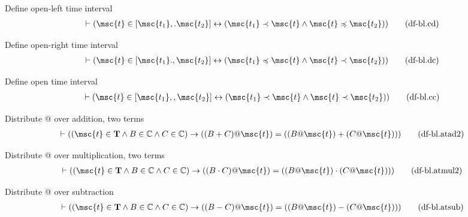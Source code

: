 \begin{metadefinition} Define open-left time interval
\begin{align}
\vdash ( \msc{t} \in [ \msc{t_1} ,. \msc{t_2} ] \leftrightarrow ( \msc{t_1} \prec \msc{t} \wedge \msc{t} \preccurlyeq \msc{t_2} ) )\label{eq:df-bl.cd}\tag{df-bl.cd}
\end{align}
\end{metadefinition}


\begin{metadefinition} Define open-right time interval
\begin{align}
\vdash ( \msc{t} \in [ \msc{t_1} ., \msc{t_2} ] \leftrightarrow ( \msc{t_1} \preccurlyeq \msc{t} \wedge \msc{t} \prec \msc{t_2} ) )\label{eq:df-bl.dc}\tag{df-bl.dc}
\end{align}
\end{metadefinition}


\begin{metadefinition} Define open time interval
\begin{align}
\vdash ( \msc{t} \in [ \msc{t_1} ,, \msc{t_2} ] \leftrightarrow ( \msc{t_1} \prec \msc{t} \wedge \msc{t} \prec \msc{t_2} ) )\label{eq:df-bl.cc}\tag{df-bl.cc}
\end{align}
\end{metadefinition}


\begin{metadefinition} Distribute @ over addition, two terms
\begin{align}
\vdash ( ( \msc{t} \in \mathbf{T} \wedge B \in \mathbb{C} \wedge C \in \mathbb{C} ) \rightarrow ( ( B + C ) @ \msc{t} ) = ( ( B @ \msc{t} ) + ( C @ \msc{t} ) ) )\label{eq:df-bl.atad2}\tag{df-bl.atad2}
\end{align}
\end{metadefinition}


\begin{metadefinition} Distribute @ over multiplication, two terms
\begin{align}
\vdash ( ( \msc{t} \in \mathbf{T} \wedge B \in \mathbb{C} \wedge C \in \mathbb{C} ) \rightarrow ( ( B \cdot C ) @ \msc{t} ) = ( ( B @ \msc{t} ) \cdot ( C @ \msc{t} ) )
    )\label{eq:df-bl.atmul2}\tag{df-bl.atmul2}
\end{align}
\end{metadefinition}


\begin{metadefinition} Distribute @ over subtraction
\begin{align}
\vdash ( ( \msc{t} \in \mathbf{T} \wedge B \in \mathbb{C} \wedge C \in \mathbb{C} ) \rightarrow ( ( B - C ) @ \msc{t} ) = ( ( B @ \msc{t} ) - ( C @ \msc{t} ) ) )\label{eq:df-bl.atsub}\tag{df-bl.atsub}
\end{align}
\end{metadefinition}


